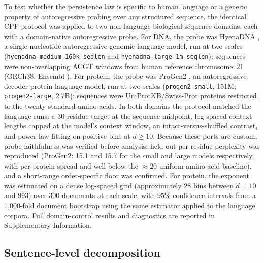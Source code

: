 \documentclass[11pt]{article}
\begin{document}
To test whether the persistence law is specific to human language or a generic property of
autoregressive probing over any structured sequence, the identical CPF protocol was applied
to two non-language biological-sequence domains, each with a domain-native autoregressive
probe. For DNA, the probe was HyenaDNA \citep{nguyen2023hyenadna}, a single-nucleotide
autoregressive genomic language model, run at two scales
(\texttt{hyenadna-medium-160k-seqlen} and \texttt{hyenadna-large-1m-seqlen}); sequences were
non-overlapping ACGT windows from human reference chromosome~21 (GRCh38, Ensembl
\citep{cunningham2022ensembl}). For protein, the
probe was ProGen2 \citep{nijkamp2023progen2}, an autoregressive decoder protein language
model, run at two scales (\texttt{progen2-small}, 151M; \texttt{progen2-large}, 2.7B);
sequences were UniProtKB/Swiss-Prot proteins \citep{uniprot2023} restricted to the twenty standard amino acids. In both
domains the protocol matched the language runs: a 30-residue target at the sequence midpoint,
log-spaced context lengths capped at the model's context window, an intact-versus-shuffled
contrast, and power-law fitting on positive bins at $d \geq 10$. Because these ports are
custom, probe faithfulness was verified before analysis: held-out per-residue perplexity was
reproduced (ProGen2: 15.1 and 15.7 for the small and large models respectively, with per-protein
spread and well below the $\approx 20$ uniform-amino-acid baseline), and a short-range
order-specific floor was confirmed. For protein, the exponent was estimated on a dense
log-spaced grid (approximately 28 bins between $d = 10$ and $993$) over 300 documents at each
scale, with 95\% confidence intervals from a 1{,}000-fold document bootstrap using the same
estimator applied to the language corpora. Full domain-control results and diagnostics are
reported in Supplementary Information.

\subsection{Sentence-level decomposition}
\end{document}
